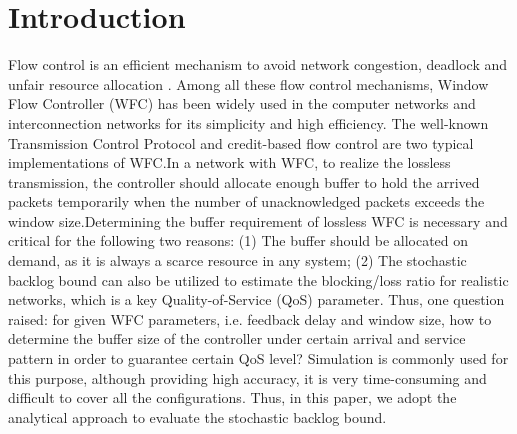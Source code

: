\documentclass[paper]{ieice}
\begin{document}
\section{Introduction}
Flow control is an efficient mechanism to avoid network congestion, deadlock and unfair resource allocation \cite{1094691}. Among all these flow control mechanisms, Window Flow Controller (WFC) has been widely used in the computer networks and interconnection networks for its simplicity and high efficiency. The well-known Transmission Control Protocol \cite{RFC5681} and credit-based flow control \cite{372658,DaTo04} are two typical implementations of WFC.\@ In a network with WFC, to realize the lossless transmission, the controller should allocate enough buffer to hold the arrived packets temporarily when the number of unacknowledged packets exceeds the window size.\@ Determining the buffer requirement of lossless WFC is necessary and critical for the following two reasons: (1) The buffer should be allocated on demand, as it is always a scarce resource in any system; (2) The stochastic backlog bound can also be utilized to estimate the blocking/loss ratio for realistic networks, which is a key Quality-of-Service (QoS) parameter. Thus, one question raised: for given WFC parameters, i.e. feedback delay and window size, how to determine the buffer size of the controller under certain arrival and service pattern in order to guarantee certain QoS level? Simulation is commonly used for this purpose, although providing high accuracy, it is very time-consuming and difficult to cover all the configurations. Thus, in this paper, we adopt the analytical approach to evaluate the stochastic backlog bound.
\end{document}
